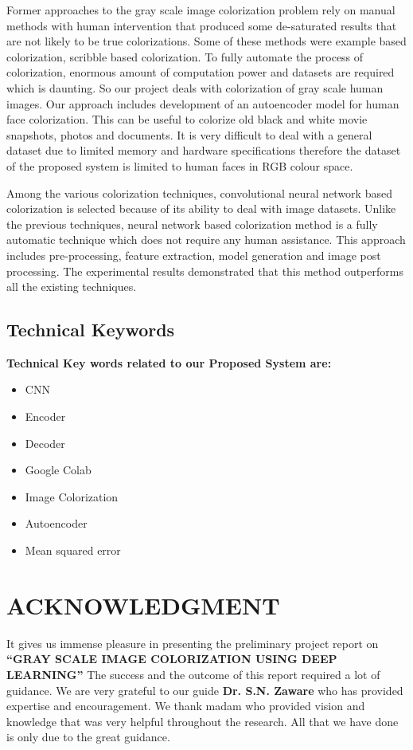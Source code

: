 \documentclass[12pt]{report}	%
\begin{document}
\hspace{2cm}Former approaches to the gray scale image colorization problem rely on manual methods with human intervention that produced some de-saturated results that are not likely to be true colorizations. Some of these methods were example based colorization, scribble based colorization. To fully automate the process of colorization, enormous amount of computation power and datasets are required which is daunting. So our project deals with colorization of gray scale human images. Our approach includes development of an autoencoder model for human face colorization. This can be useful to colorize old black and white movie snapshots, photos and documents. It is very difficult to deal with a general dataset due to limited memory and hardware specifications therefore the dataset of the proposed system is limited to human faces in RGB colour space.
\par{\hspace{0.5cm}} Among the various colorization techniques, convolutional neural network based colorization is selected because of its ability to deal with image datasets. Unlike the previous techniques, neural network based colorization method is a fully automatic technique which does not require any human assistance. This approach includes pre-processing, feature extraction, model generation and image post processing. The experimental results demonstrated that this method outperforms all the existing techniques. 

\section{Technical Keywords}

 {\bfseries Technical Key words related to our Proposed System are:}       
 \begin{itemize}
   \item 	CNN
   \item 	Encoder 
   \item 	Decoder
   \item	Google Colab
   \item	Image Colorization
   \item	Autoencoder
   \item    Mean squared error
 \end{itemize}
 \newpage

\chapter*{ACKNOWLEDGMENT}
It gives us immense pleasure in presenting the preliminary project report on \\
 {\bf {``GRAY SCALE IMAGE COLORIZATION USING DEEP LEARNING''}} The success and the outcome of this report required a lot of guidance. We are very grateful to our guide \textbf{Dr. S.N. Zaware} who has provided expertise and encouragement. We thank madam who provided vision and knowledge that was very helpful throughout the research. All that we have done is only due to the great guidance. 
\end{document}
